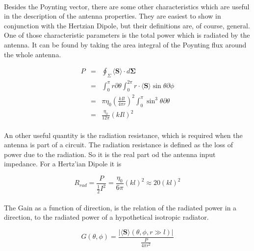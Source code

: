 \documentclass[a4paper,10pt]{thesis}
\begin{document}
\paragraph*{}
Besides the Poynting vector, there are some other characteristics which are useful in the description of the antenna properties. They are easiest to show in conjunction with the Hertzian Dipole, but their definitions are, of course, general. One of those characteristic parameters is the total power which is radiated by the antenna. It can be found by taking the area integral of the Poynting flux around the whole antenna.

\begin{eqnarray}\label{total_power_hd}
P &=& \oint_\Sigma \langle \mathbf{S} \rangle \cdot d\mathbf{\Sigma} \\
&=& \int_0^{\pi} r\partial \theta \int_0^{2\pi } r\cdot \langle \mathbf{S} \rangle \sin \theta \partial \phi \nonumber \\
&=& \pi \eta_0 \left( \frac{ k I l}{4 \pi r}\right)^2 \int_0^{\pi} \sin^3 \theta\partial \theta \nonumber \\
&=& \frac{\eta_0}{12 \pi} (kIl)^2 \nonumber
\end{eqnarray}

\paragraph*{}
An other useful quantity is the radiation resistance, which is required when the antenna is part of a circuit. The radiation resistance is defined as the loss of power due to the radiation. So it is the real part od the antenna input impedance. For a Hertz'ian Dipole it is

\begin{equation}\label{radiation_resistance_hd}
R_{rad} = \frac{P}{\frac{1}{2} I^2} = \frac{\eta_0}{6\pi}(kl)^2 \approx 20 (kl)^2
\end{equation}

\paragraph*{}
The Gain as a function of direction, is the relation of the radiated power in a direction, to the radiated power of a hypothetical isotropic radiator.

\begin{equation}\label{gain}
G( \theta , \phi )= \frac{| \langle \mathbf{S} \rangle ( \theta , \phi , r\gg l) | }{\frac{P}{4\pi r^2}}
\end{equation}
\end{document}
